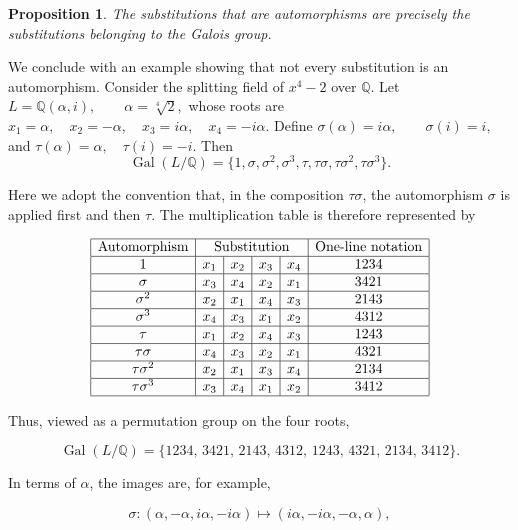 \documentclass[a4paper,11pt]{article}
\newtheorem{proposition}{Proposition}
\begin{document}
 \begin{proposition}
 	\label{prop:auto}
 	The substitutions that are automorphisms are precisely the substitutions belonging to the Galois group.
 \end{proposition}
 
 We conclude with an example showing that not every substitution is an automorphism. Consider the splitting field of \(x^4-2\) over \(\mathbb{Q}\).
  Let
  \(
 L=\mathbb{Q}(\alpha,i),
 \qquad
 \alpha=\sqrt[4]{2},
 \)
  whose roots are
  \(
 x_1=\alpha,\quad
 x_2=-\alpha,\quad
 x_3=i\alpha,\quad
 x_4=-i\alpha.
 \) 
 Define
  \(
 \sigma(\alpha)=i\alpha,
 \qquad
 \sigma(i)=i,
 \)
  and
  \(
 \tau(\alpha)=\alpha,
 \quad
 \tau(i)=-i.
 \)
  Then
  \[
 \operatorname{Gal}(L/\mathbb{Q})
 =
 \{
 1,\sigma,\sigma^2,\sigma^3,
 \tau,\tau\sigma,\tau\sigma^2,\tau\sigma^3
 \}.
 \]
 
 Here we adopt the convention that, in the composition \(\tau\sigma\), the automorphism \(\sigma\) is applied first and then \(\tau\). The multiplication table is therefore represented by
 
 \[
 \begin{array}{|c|c|c|c|c|c|}
 	\hline
 	\text{Automorphism}
 	&\multicolumn{4}{c|}{\text{Substitution}}
 	&\text{One-line notation}\\
 	\hline
 	1
 	&x_1&x_2&x_3&x_4
 	&1234\\
 	\hline
 	\sigma
 	&x_3&x_4&x_2&x_1
 	&3421\\
 	\hline
 	\sigma^2
 	&x_2&x_1&x_4&x_3
 	&2143\\
 	\hline
 	\sigma^3
 	&x_4&x_3&x_1&x_2
 	&4312\\
 	\hline
 	\tau
 	&x_1&x_2&x_4&x_3
 	&1243\\
 	\hline
 	\tau\sigma
 	&x_4&x_3&x_2&x_1
 	&4321\\
 	\hline
 	\tau\sigma^2
 	&x_2&x_1&x_3&x_4
 	&2134\\
 	\hline
 	\tau\sigma^3
 	&x_3&x_4&x_1&x_2
 	&3412\\
 	\hline
 \end{array}
 \]
 
 Thus, viewed as a permutation group on the four roots,
 
 \[
 \operatorname{Gal}(L/\mathbb{Q})
 =
 \{
 1234,\,
 3421,\,
 2143,\,
 4312,\,
 1243,\,
 4321,\,
 2134,\,
 3412
 \}.
 \]
 
 In terms of \(\alpha\), the images are, for example,
 
 \[
 \sigma:
 (\alpha,-\alpha,i\alpha,-i\alpha)
 \longmapsto
 (i\alpha,-i\alpha,-\alpha,\alpha),
 \]
 
\end{document}
